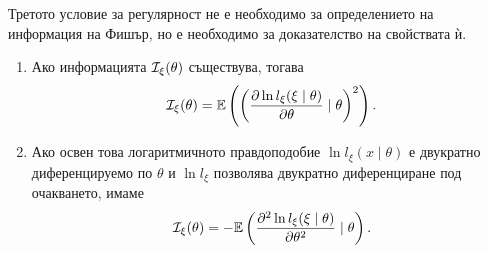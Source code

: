 \documentclass[numbers=endperiod, bibliography=totocnumbered]{scrartcl}
\begin{document}
\begin{note}
  Третото условие за регулярност не е необходимо за определението на информация на Фишър, но е необходимо за доказателство на свойствата ѝ.
\end{note}

\begin{theorem}
  \mbox{}
  \begin{enumerate}
    \item Ако информацията \( \mathcal{I}_\xi(\theta) \) съществува, тогава
    \begin{align*}
      \mathcal{I}_\xi(\theta) = \mathbb{E}\left( {\left( \frac {\partial \ln l_\xi(\xi \mid \theta)} {\partial \theta} \mid \theta \right)}^2 \right).
    \end{align*}

    \item Ако освен това логаритмичното правдоподобие \( \ln l_\xi (x \mid \theta) \) е двукратно диференцируемо по \( \theta \) и \( \ln l_\xi \) позволява двукратно диференциране под очакването, имаме
    \begin{align*}
      \mathcal{I}_\xi(\theta) = -\mathbb{E}\left( \frac {\partial^2 \ln l_\xi(\xi \mid \theta)} {\partial \theta^2} \mid \theta \right).
    \end{align*}
  \end{enumerate}
\end{theorem}
\end{document}
